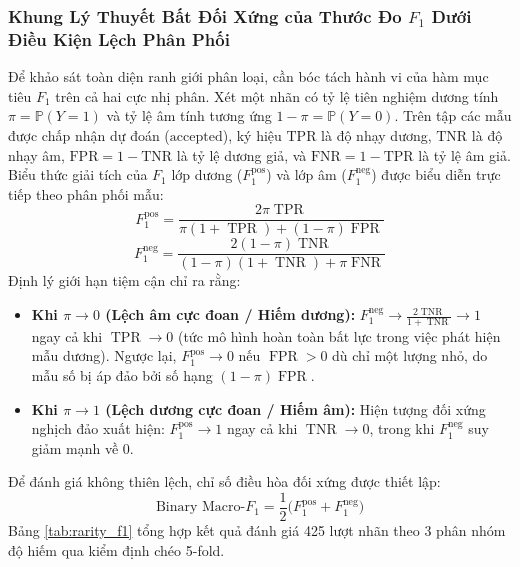 \documentclass[10pt,a4paper]{article}
\begin{document}
\subsubsection{Khung Lý Thuyết Bất Đối Xứng của Thước Đo \texorpdfstring{$F_1$}{F1} Dưới Điều Kiện Lệch Phân Phối}
Để khảo sát toàn diện ranh giới phân loại, cần bóc tách hành vi của hàm mục tiêu $F_1$ trên cả hai cực nhị phân. Xét một nhãn có tỷ lệ tiên nghiệm dương tính $\pi = \mathbb{P}(Y=1)$ và tỷ lệ âm tính tương ứng $1 - \pi = \mathbb{P}(Y=0)$. Trên tập các mẫu được chấp nhận dự đoán ($\text{accepted}$), ký hiệu $\text{TPR}$ là độ nhạy dương, $\text{TNR}$ là độ nhạy âm, $\text{FPR} = 1 - \text{TNR}$ là tỷ lệ dương giả, và $\text{FNR} = 1 - \text{TPR}$ là tỷ lệ âm giả. Biểu thức giải tích của $F_1$ lớp dương ($F_1^{\text{pos}}$) và lớp âm ($F_1^{\text{neg}}$) được biểu diễn trực tiếp theo phân phối mẫu:
\begin{equation}
    F_1^{\text{pos}} = \frac{2 \pi \operatorname{TPR}}{\pi (1 + \operatorname{TPR}) + (1-\pi) \operatorname{FPR}}
\end{equation}
\begin{equation}
    F_1^{\text{neg}} = \frac{2 (1-\pi) \operatorname{TNR}}{(1-\pi) (1 + \operatorname{TNR}) + \pi \operatorname{FNR}}
\end{equation}
Định lý giới hạn tiệm cận chỉ ra rằng:
\begin{itemize}[leftmargin=*]
    \item \textbf{Khi $\pi \to 0$ (Lệch âm cực đoan / Hiếm dương):} $F_1^{\text{neg}} \to \frac{2 \operatorname{TNR}}{1 + \operatorname{TNR}} \to 1$ ngay cả khi $\operatorname{TPR} \to 0$ (tức mô hình hoàn toàn bất lực trong việc phát hiện mẫu dương). Ngược lại, $F_1^{\text{pos}} \to 0$ nếu $\operatorname{FPR} > 0$ dù chỉ một lượng nhỏ, do mẫu số bị áp đảo bởi số hạng $(1-\pi)\operatorname{FPR}$.
    \item \textbf{Khi $\pi \to 1$ (Lệch dương cực đoan / Hiếm âm):} Hiện tượng đối xứng nghịch đảo xuất hiện: $F_1^{\text{pos}} \to 1$ ngay cả khi $\operatorname{TNR} \to 0$, trong khi $F_1^{\text{neg}}$ suy giảm mạnh về 0.
\end{itemize}
Để đánh giá không thiên lệch, chỉ số điều hòa đối xứng được thiết lập:
\begin{equation}
    \text{Binary Macro-}F_1 = \frac{1}{2}\big(F_1^{\text{pos}} + F_1^{\text{neg}}\big)
\end{equation}
Bảng \ref{tab:rarity_f1} tổng hợp kết quả đánh giá 425 lượt nhãn theo 3 phân nhóm độ hiếm qua kiểm định chéo 5-fold.
\end{document}
